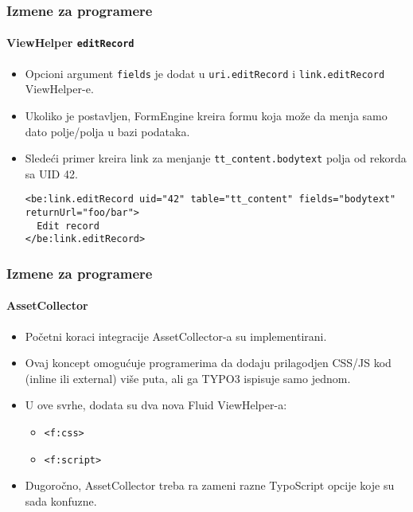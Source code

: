 
\begin{frame}[fragile]
	\frametitle{Izmene za programere}
	\framesubtitle{ViewHelper \texttt{editRecord}}

	\lstset{basicstyle=\tiny\ttfamily}

	\begin{itemize}
		\item Opcioni argument \texttt{fields} je dodat u
			\texttt{uri.editRecord} i \texttt{link.editRecord} ViewHelper-e.
		\item Ukoliko je postavljen, FormEngine kreira formu koja može da menja samo dato polje/polja u bazi podataka.
		\item Sledeći primer kreira link za menjanje \texttt{tt\_content.bodytext} polja od rekorda sa UID 42.

\begin{lstlisting}
<be:link.editRecord uid="42" table="tt_content" fields="bodytext" returnUrl="foo/bar">
  Edit record
</be:link.editRecord>
\end{lstlisting}

	\end{itemize}

\end{frame}


\begin{frame}[fragile]
	\frametitle{Izmene za programere}
	\framesubtitle{AssetCollector}

	\begin{itemize}
		\item Početni koraci integracije AssetCollector-a su implementirani.
		\item Ovaj koncept omogućuje programerima da dodaju prilagodjen CSS/JS kod (inline ili external)
			više puta, ali ga TYPO3 ispisuje samo jednom.
		\item U ove svrhe, dodata su dva nova Fluid ViewHelper-a:
			\begin{itemize}
				\item \texttt{<f:css>}
				\item \texttt{<f:script>}
			\end{itemize}
		\item Dugoročno, AssetCollector  treba ra zameni razne TypoScript opcije koje su sada konfuzne.
	\end{itemize}

\end{frame}

